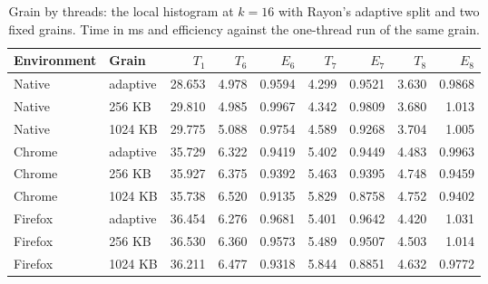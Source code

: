 \begin{table}[htbp]
\caption{Grain by threads: the local histogram at $k=16$ with Rayon's adaptive split and two fixed grains. Time in ms and efficiency against the one-thread run of the same grain.}\label{tab:grain-threads}
\centering\small
\begin{tabular}{llrrrrrrr}
\toprule
Environment & Grain & $T_1$ & $T_6$ & $E_6$ & $T_7$ & $E_7$ & $T_8$ & $E_8$ \\
\midrule
Native & adaptive & 28.653 & 4.978 & 0.9594 & 4.299 & 0.9521 & 3.630 & 0.9868 \\
Native & 256 KB & 29.810 & 4.985 & 0.9967 & 4.342 & 0.9809 & 3.680 & 1.013 \\
Native & 1024 KB & 29.775 & 5.088 & 0.9754 & 4.589 & 0.9268 & 3.704 & 1.005 \\
\midrule
Chrome & adaptive & 35.729 & 6.322 & 0.9419 & 5.402 & 0.9449 & 4.483 & 0.9963 \\
Chrome & 256 KB & 35.927 & 6.375 & 0.9392 & 5.463 & 0.9395 & 4.748 & 0.9459 \\
Chrome & 1024 KB & 35.738 & 6.520 & 0.9135 & 5.829 & 0.8758 & 4.752 & 0.9402 \\
\midrule
Firefox & adaptive & 36.454 & 6.276 & 0.9681 & 5.401 & 0.9642 & 4.420 & 1.031 \\
Firefox & 256 KB & 36.530 & 6.360 & 0.9573 & 5.489 & 0.9507 & 4.503 & 1.014 \\
Firefox & 1024 KB & 36.211 & 6.477 & 0.9318 & 5.844 & 0.8851 & 4.632 & 0.9772 \\
\bottomrule
\end{tabular}
\end{table}
